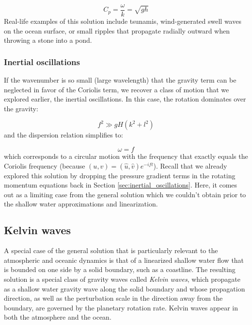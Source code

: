 \documentclass[12pt]{article}
\numberwithin{equation}{section}
\numberwithin{figure}{section}
\numberwithin{table}{section}
\begin{document}
\begin{equation}
  C_p = \frac{\omega}{k} = \sqrt{g h}
  \label{eq:shallow_water_phase_speed}
\end{equation}
Real-life examples of this solution include tsunamis, wind-generated swell
waves on the ocean surface, or small ripples that propagate radially outward
when throwing a stone into a pond.

\subsubsection{Inertial oscillations}

If the wavenumber is so small (large wavelength) that the gravity term can be
neglected in favor of the Coriolis term, we recover a class of motion that we
explored earlier, the inertial oscillations.
In this case, the rotation dominates over the gravity:

\begin{equation}
  f^2 \gg gH(k^2 + l^2)
\end{equation}
and the dispersion relation simplifies to:

\begin{equation}
  \omega = f
\end{equation}
which corresponds to a circular motion with the frequency that exactly equals
the Coriolis frequency (because $(u, v) = (\widehat{u}, \widehat{v}) e^{- i f t}$).
Recall that we already explored this solution by dropping the pressure gradient
terms in the rotating momentum equations back in Section
\ref{sec:inertial_oscillations}.
Here, it comes out as a limiting case from the general solution which we
couldn't obtain prior to the shallow water approximations and linearization.

\subsection{Kelvin waves}

A special case of the general solution that is particularly relevant to the
atmospheric and oceanic dynamics is that of a linearized shallow water flow
that is bounded on one side by a solid boundary, such as a coastline.
The resulting solution is a special class of gravity waves called
\textit{Kelvin waves}, which propagate as a shallow water
gravity wave along the solid boundary and whose propagation direction, as well
as the perturbation scale in the direction away from the boundary, are governed
by the planetary rotation rate.
Kelvin waves appear in both the atmosphere and the ocean.
\end{document}
